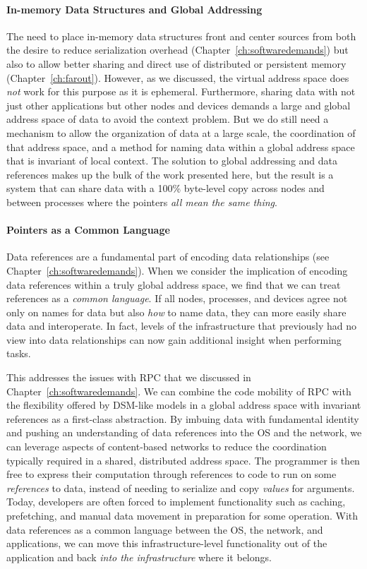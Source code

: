 \paragraph{In-memory Data Structures and Global Addressing}
The need to place in-memory data structures front and center sources from both the desire to reduce serialization
overhead (Chapter~\ref{ch:softwaredemands}) but also to allow better sharing and direct use of distributed or persistent
memory (Chapter~\ref{ch:farout}). However, as we discussed, the virtual address space does \emph{not} work for this
purpose as it is ephemeral.
Furthermore, sharing data with not just other applications but other nodes and devices demands a large and global
address space of data to avoid the context problem. But
we do still need a mechanism to allow the organization of data at a large scale, the coordination of that address space,
and a method for naming data within a global address space that is invariant of local context. The solution to global
addressing and data references makes up the bulk of the work presented here, but the result is a system that can share
data with a 100\% byte-level copy across nodes and between processes where the pointers \emph{all mean the same thing}.


\paragraph{Pointers as a Common Language} Data references are a fundamental part of encoding data relationships (see
Chapter~\ref{ch:softwaredemands}). When we consider the implication of encoding data references within a truly global
address space, we find that we can treat references as a \emph{common language}. If all nodes, processes, and devices
agree not only on names for data but also \emph{how} to name data, they can more easily share data and interoperate. In
fact, levels of the infrastructure that previously had no view into data relationships can now gain additional insight
when performing tasks.

This addresses the issues with RPC that we discussed in Chapter~\ref{ch:softwaredemands}.
We can combine the code mobility of RPC with the flexibility offered by
DSM-like models in a global address space with invariant references as a first-class abstraction. By
imbuing data with fundamental identity and pushing an understanding of data references into the OS
and the network, we can leverage aspects of content-based networks to reduce the coordination
typically required in a shared, distributed address space. The programmer is then free to express
their computation through references to code to run on some \emph{references} to data, instead
of needing to serialize and copy \emph{values} for arguments.
Today, developers are often forced to implement functionality such as caching, prefetching, and
manual data movement in preparation for some operation.
With data references as a common
language between the OS, the network, and applications, we can move this infrastructure-level functionality
out of the application and back \emph{into the infrastructure} where it belongs.

